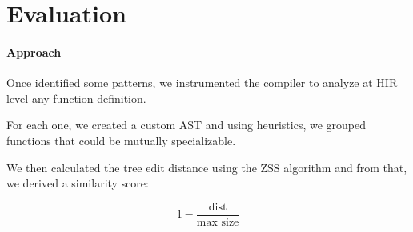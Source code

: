 \section{Evaluation}\label{sec:evaluation}


\begin{frame}{\secname}
	\framesubtitle{Approach}

	Once identified some patterns, %
	we \alert{instrumented} the compiler to analyze at \alert{HIR} level %
	any function definition.

	\bigskip

	For each one, we created a custom \alert{AST} %
	and using heuristics, we grouped functions that could be mutually specializable. %

	\bigskip

	We then calculated the \alert{tree edit distance} %
	using the ZSS algorithm %
	and from that, we derived a similarity score:

	$$1 - \frac{\text{dist}}{\text{max size}}$$


\end{frame}


